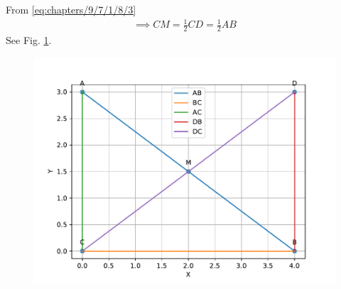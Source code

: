 \documentclass[10pt]{article}
\begin{document}
From \eqref{eq:chapters/9/7/1/8/3}
\begin{align}
	\implies CM = \frac{1}{2}CD = \frac{1}{2}AB 
\end{align}
See Fig. 
\ref{fig:chapters/9/7/1/8/1}.
\begin{figure}[!h]
	\begin{center}
		\includegraphics[width=\columnwidth]{./chapters/9/7/1/8/figs/fig.pdf}
	\end{center}
\caption{}
\label{fig:chapters/9/7/1/8/1}
\end{figure}
\end{document}
